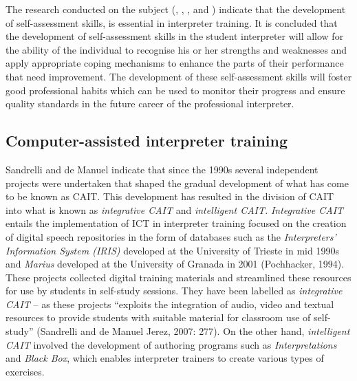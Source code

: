 \documentclass[output=paper]{langsci/langscibook}
\begin{document}
The research conducted on the subject (\citealt{Riccardi2002}, \citealt{Lee2005}, \citealt{Sandrelli2007}, \citealt{Fowler2007} and \citealt{Pinazo2008}) indicate that the development of self-assessment skills, is essential in interpreter training. It is concluded that the development of self-assessment skills in the student interpreter will allow for the ability of the individual to recognise his or her strengths and weaknesses and apply appropriate coping mechanisms to enhance the parts of their performance that need improvement. The development of these self-assessment skills will foster good professional habits which can be used to monitor their progress and ensure quality standards in the future career of the professional interpreter. 

\subsection{Computer-assisted interpreter training}
Sandrelli and de Manuel \citet[277]{Jerez2007} indicate that since the 1990s several independent projects were undertaken that shaped the gradual development of what has come to be known as CAIT. This development has resulted in the division of CAIT into what is known as \textit{integrative CAIT} and \textit{intelligent CAIT.} \textit{Integrative CAIT} entails the  implementation of ICT in interpreter training focused on the creation of digital speech repositories in the form of databases such as the \textit{Interpreters’ Information System (IRIS)} developed at the University of Trieste in mid 1990s \citep{Carabelli1999} and \textit{Marius} developed at the University of Granada in 2001 (Pochhacker, 1994). These projects collected digital training materials and streamlined these resources for use by students in self-study sessions. They have been labelled as \textit{integrative CAIT} – as these projects “exploits the integration of audio, video and textual resources to provide students with suitable material for classroom use of self-study” (Sandrelli and de Manuel Jerez, 2007: 277). On the other hand, \textit{intelligent CAIT} involved the development of authoring programs such as \textit{Interpretations} and \textit{Black Box}, which enables interpreter trainers to create various types of exercises. 
\end{document}
